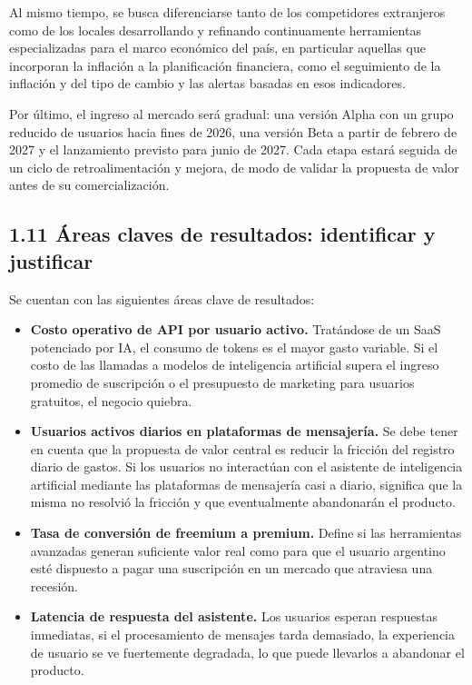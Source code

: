 Al mismo tiempo, se busca diferenciarse tanto de los competidores
extranjeros como de los locales desarrollando y refinando continuamente
herramientas especializadas para el marco económico del país, en
particular aquellas que incorporan la inflación a la planificación
financiera, como el seguimiento de la inflación y del tipo de cambio y
las alertas basadas en esos indicadores.

Por último, el ingreso al mercado será gradual: una versión Alpha con un
grupo reducido de usuarios hacia fines de 2026, una versión Beta a
partir de febrero de 2027 y el lanzamiento previsto para junio de 2027.
Cada etapa estará seguida de un ciclo de retroalimentación y mejora, de
modo de validar la propuesta de valor antes de su comercialización.

\subsection*{1.11 Áreas claves de resultados: identificar y
justificar}\label{uxe1reas-claves-de-resultados-identificar-y-justificar}

Se cuentan con las siguientes áreas clave de resultados:

\begin{itemize}
\tightlist
\item
  \textbf{Costo operativo de API por usuario activo.} Tratándose de un
  SaaS potenciado por IA, el consumo de tokens es el mayor gasto
  variable. Si el costo de las llamadas a modelos de inteligencia
  artificial supera el ingreso promedio de suscripción o el presupuesto
  de marketing para usuarios gratuitos, el negocio quiebra.
\item
  \textbf{Usuarios activos diarios en plataformas de mensajería.} Se
  debe tener en cuenta que la propuesta de valor central es reducir la
  fricción del registro diario de gastos. Si los usuarios no interactúan
  con el asistente de inteligencia artificial mediante las plataformas
  de mensajería casi a diario, significa que la misma no resolvió la
  fricción y que eventualmente abandonarán el producto.
\item
  \textbf{Tasa de conversión de freemium a premium.} Define si las
  herramientas avanzadas generan suficiente valor real como para que el
  usuario argentino esté dispuesto a pagar una suscripción en un mercado
  que atraviesa una recesión.
\item
  \textbf{Latencia de respuesta del asistente.} Los usuarios esperan
  respuestas inmediatas, si el procesamiento de mensajes tarda
  demasiado, la experiencia de usuario se ve fuertemente degradada, lo
  que puede llevarlos a abandonar el producto.
\end{itemize}

